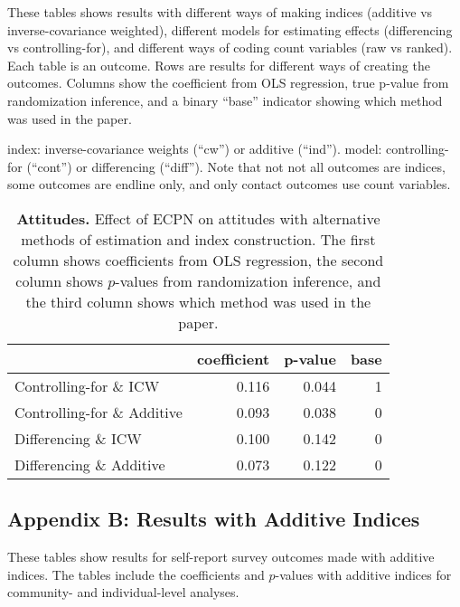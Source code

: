 \documentclass[
]{article}
\begin{document}
These tables shows results with different ways of making indices
(additive vs inverse-covariance weighted), different models for
estimating effects (differencing vs controlling-for), and different ways
of coding count variables (raw vs ranked). Each table is an outcome.
Rows are results for different ways of creating the outcomes. Columns
show the coefficient from OLS regression, true p-value from
randomization inference, and a binary ``base'' indicator showing which
method was used in the paper.

index: inverse-covariance weights (``cw'') or additive (``ind''). model:
controlling-for (``cont'') or differencing (``diff''). Note that not not
all outcomes are indices, some outcomes are endline only, and only
contact outcomes use count variables.

\begin{table}[H]
\begin{center}
\label{tab:attitude_tab}
\caption{\textbf{Attitudes.} Effect of ECPN on attitudes with alternative methods of estimation and index construction. The first column shows coefficients from OLS regression, the second column shows $p$-values from randomization inference, and the third column shows which method was used in the paper.}
\smallskip

\begin{tabular}{l|r|r|r}
\hline
  & coefficient & p-value & base\\
\hline
Controlling-for \& ICW & 0.116 & 0.044 & 1\\
\hline
Controlling-for \& Additive & 0.093 & 0.038 & 0\\
\hline
Differencing \& ICW & 0.100 & 0.142 & 0\\
\hline
Differencing \& Additive & 0.073 & 0.122 & 0\\
\hline
\end{tabular}


\end{center}
\end{table}

\hypertarget{appendix-b-results-with-additive-indices}{%
\subsection{Appendix B: Results with Additive
Indices}\label{appendix-b-results-with-additive-indices}}

These tables show results for self-report survey outcomes made with
additive indices. The tables include the coefficients and \(p\)-values
with additive indices for community- and individual-level analyses.
\end{document}
